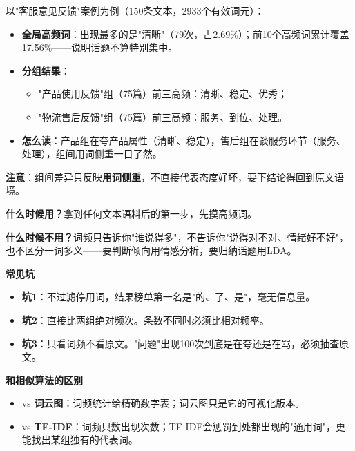 \begin{algoresult}
以"客服意见反馈"案例为例（150条文本，2933个有效词元）：

\begin{itemize}
    \item \textbf{全局高频词}：出现最多的是"清晰"（79次，占2.69\%）；前10个高频词累计覆盖17.56\%——说明话题不算特别集中。
    \item \textbf{分组结果}：
    \begin{itemize}
        \item "产品使用反馈"组（75篇）前三高频：清晰、稳定、优秀；
        \item "物流售后反馈"组（75篇）前三高频：服务、到位、处理。
    \end{itemize}
    \item \textbf{怎么读}：产品组在夸产品属性（清晰、稳定），售后组在谈服务环节（服务、处理），组间用词侧重一目了然。
\end{itemize}

\textbf{注意}：组间差异只反映\textbf{用词侧重}，不直接代表态度好坏，要下结论得回到原文语境。
\end{algoresult}

\begin{algonotes}
\textbf{什么时候用？}拿到任何文本语料后的第一步，先摸高频词。

\textbf{什么时候不用？}词频只告诉你"谁说得多"，不告诉你"说得对不对、情绪好不好"，也不区分一词多义——要判断倾向用情感分析，要归纳话题用LDA。

\textbf{常见坑}
\begin{itemize}
    \item \textbf{坑1}：不过滤停用词，结果榜单第一名是"的、了、是"，毫无信息量。
    \item \textbf{坑2}：直接比两组绝对频次。条数不同时必须比相对频率。
    \item \textbf{坑3}：只看词频不看原文。"问题"出现100次到底是在夸还是在骂，必须抽查原文。
\end{itemize}

\textbf{和相似算法的区别}
\begin{itemize}
    \item vs \textbf{词云图}：词频统计给精确数字表；词云图只是它的可视化版本。
    \item vs \textbf{TF-IDF}：词频只数出现次数；TF-IDF会惩罚到处都出现的"通用词"，更能找出某组独有的代表词。
\end{itemize}
\end{algonotes}


